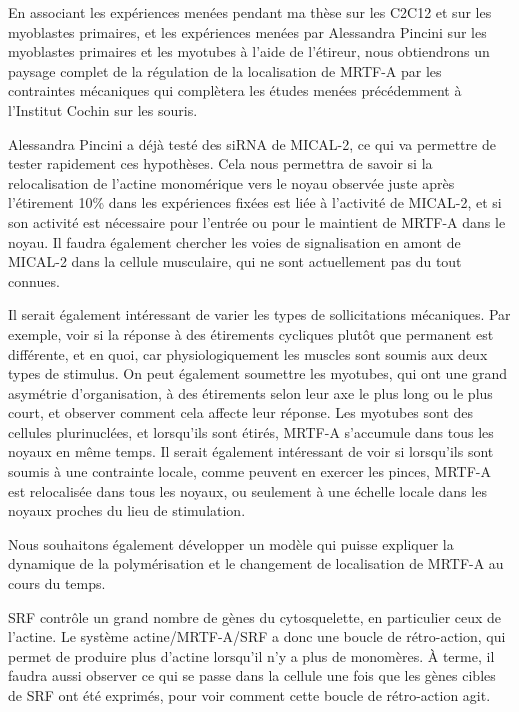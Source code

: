 En associant les expériences menées pendant ma thèse sur les C2C12 et sur les myoblastes primaires, et les expériences menées par Alessandra Pincini sur les myoblastes primaires et les myotubes à l'aide de l'étireur, nous obtiendrons un paysage complet de la régulation de la localisation de MRTF-A par les contraintes mécaniques qui complètera les études menées précédemment à l'Institut Cochin sur les souris. 

Alessandra Pincini a déjà testé des siRNA de MICAL-2, ce qui va permettre de tester rapidement ces hypothèses. Cela nous permettra de savoir si la relocalisation de l'actine monomérique vers le noyau observée juste après l'étirement 10\% dans les expériences fixées est liée à l'activité de MICAL-2, et si son activité est nécessaire pour l'entrée ou pour le maintient de MRTF-A dans le noyau. 
Il faudra également chercher les voies de signalisation en amont de MICAL-2 dans la cellule musculaire, qui ne sont actuellement pas du tout connues. 

Il serait également intéressant de varier les types de sollicitations mécaniques. Par exemple, voir si la réponse à des étirements cycliques plutôt que permanent est différente, et en quoi, car physiologiquement les muscles sont soumis aux deux types de stimulus. On peut également soumettre les myotubes, qui ont une grand asymétrie d'organisation, à des étirements selon leur axe le plus long ou le plus court, et observer comment cela affecte leur réponse. Les myotubes sont des cellules plurinuclées, et lorsqu'ils sont étirés, MRTF-A s'accumule dans tous les noyaux en même temps. Il serait également intéressant de voir si lorsqu'ils sont soumis à une contrainte locale, comme peuvent en exercer les pinces, MRTF-A est relocalisée dans tous les noyaux, ou seulement à une échelle locale dans les noyaux proches du lieu de stimulation. 

Nous souhaitons également développer un modèle qui puisse expliquer la dynamique de la polymérisation et le changement de localisation de MRTF-A au cours du temps. 

SRF contrôle un grand nombre de gènes du cytosquelette, en particulier ceux de l'actine. Le système actine/MRTF-A/SRF a donc une boucle de rétro-action, qui permet de produire plus d'actine lorsqu'il n'y a plus de monomères. À terme, il faudra aussi observer ce qui se passe dans la cellule une fois que les gènes cibles de SRF ont été exprimés, pour voir comment cette boucle de rétro-action agit. 






%
%